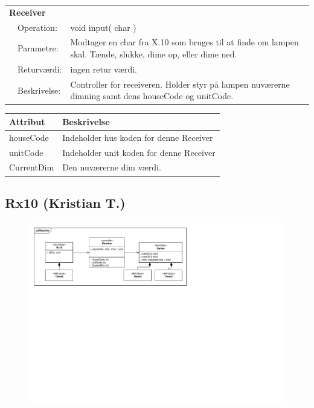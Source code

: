 \begin{table}[h]
\begin{tabularx}{\textwidth}{p{0.6 cm} l X} %
\multicolumn{3}{l}{\textbf{Receiver}}\\
& Operation: & %
void input( char ) 
\\ & Parametre: & %
Modtager en char fra X.10 som bruges til at finde om lampen skal. Tænde, slukke, dime op, eller dime ned.
\\ & Returværdi: & %
ingen retur værdi. 
\\ & Beskrivelse: & %
Controller for receiveren. Holder styr på lampen nuværerne dimning samt dens houseCode og unitCode.
\\ \end{tabularx}
\end{table}

\begin{table}[h]
\centering
\begin{tabularx}{13 cm}{|l |X|} \hline
Attribut & Beskrivelse \\ \hline

houseCode & Indeholder hus koden for denne Receiver \\ \hline
unitCode  & Indeholder unit koden for denne Receiver \\ \hline
CurrentDim & Den nuværerne dim værdi. \\ \hline

\end{tabularx}
\end{table}

\clearpage

\subsection{Rx10 (Kristian T.)}

\begin{figure}[h]
\centering
\includegraphics[scale=1,clip=true, trim=38 462 697 66]{Systemarkitektur/diagrammer/Receiver_KlasseDiagram} %
\end{figure}

